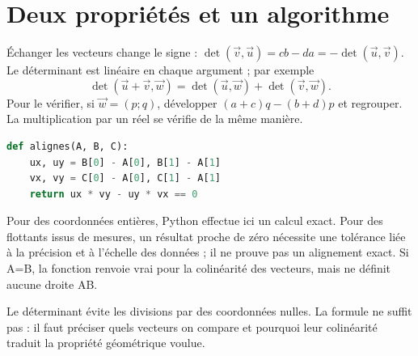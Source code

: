 \documentclass[../cours_2de.tex]{subfiles}
\begin{document}
\section{Deux propriétés et un algorithme}
Échanger les vecteurs change le signe :
$\det(\vec v,\vec u)=cb-da=-\det(\vec u,\vec v)$.
Le déterminant est linéaire en chaque argument ; par exemple
\[
\det(\vec u+\vec v,\vec w)=\det(\vec u,\vec w)+\det(\vec v,\vec w).
\]
Pour le vérifier, si $\vec w=(p;q)$, développer $(a+c)q-(b+d)p$ et regrouper. La multiplication par un réel se vérifie de la même manière.
\begin{lstlisting}[language=Python]
def alignes(A, B, C):
    ux, uy = B[0] - A[0], B[1] - A[1]
    vx, vy = C[0] - A[0], C[1] - A[1]
    return ux * vy - uy * vx == 0
\end{lstlisting}
Pour des coordonnées entières, Python effectue ici un calcul exact. Pour des flottants issus de mesures, un résultat proche de zéro nécessite une tolérance liée à la précision et à l'échelle des données ; il ne prouve pas un alignement exact. Si A=B, la fonction renvoie vrai pour la colinéarité des vecteurs, mais ne définit aucune droite AB.
\begin{retenir}
Le déterminant évite les divisions par des coordonnées nulles. La formule ne suffit pas : il faut préciser quels vecteurs on compare et pourquoi leur colinéarité traduit la propriété géométrique voulue.
\end{retenir}
\end{document}
